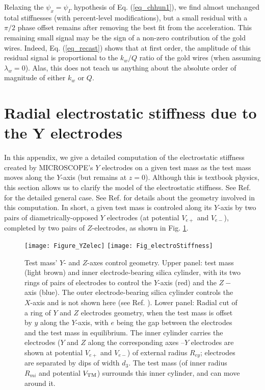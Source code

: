 \documentclass[12pt]{iopart}
\begin{document}
Relaxing the $\psi_x=\psi_\Gamma$ hypothesis of Eq. (\ref{eq_chhun1}), we find almost unchanged total stiffnesses (with percent-level modifications), but a small residual with a $\pi/2$ phase offset remains after removing the best fit from the acceleration. This remaining small signal may be the sign of a non-zero contribution of the gold wires. Indeed, Eq. (\ref{eq_recast}) shows that at first order, the amplitude of this residual signal is proportional to the $k_w/Q$ ratio of the gold wires (when assuming $\lambda_w=0$). Alas, this does not teach us anything about the absolute order of magnitude of either $k_w$ or $Q$.




\section{Radial electrostatic stiffness due to the Y electrodes} \label{app_estiffness}


In this appendix, we give a detailed computation of the electrostatic stiffness created by MICROSCOPE's $Y$ electrodes on a given test mass as the test mass moves along the $Y$-axis (but remains at $z=0$). Although this is textbook physics, this section allows us to clarify the model of the electrostatic stiffness. See Ref. \cite{hudson07} for the detailed general case. See Ref. \cite{liorzou20} for details about the geometry involved in this computation. In short, a given test mass is controled along its $Y$-axis by two pairs of diametrically-opposed $Y$ electrodes (at potential $V_{e+}$ and $V_{e-}$), completed by two pairs of $Z$-electrodes, as shown in Fig. \ref{fig_estiffness}.


\begin{figure}%
\begin{center}
\texttt{[image: Figure\_YZelec]}
\texttt{[image: Fig\_electroStiffness]}
\caption{Test mass' $Y$- and $Z$-axes control geometry. Upper panel: test mass (light brown) and inner electrode-bearing silica cylinder, with its two rings of pairs of electrodes to control the $Y$-axis (red) and the $Z-$axis (blue). The outer electrode-bearing silica cylinder controls the $X$-axis and is not shown here (see Ref. \cite{liorzou20}). Lower panel: Radial cut of a ring of $Y$ and $Z$ electrodes geometry, when the test mass is offset by $y$ along the $Y$-axis, with $e$ being the gap between the electrodes and the test mass in equilibrium. The inner cylinder carries the electrodes ($Y$ and $Z$ along the corresponding axes --$Y$ electrodes are shown at potential $V_{e+}$ and $V_{e-}$) of external radius $R_{ey}$; electrodes are separated by dips of width $d_3$. The test mass (of inner radius $R_{mi}$ and potential $V_{\rm TM}$) surrounds this inner cylinder, and can move around it.}%
\label{fig_estiffness}
\end{center}
\end{figure}
\end{document}
